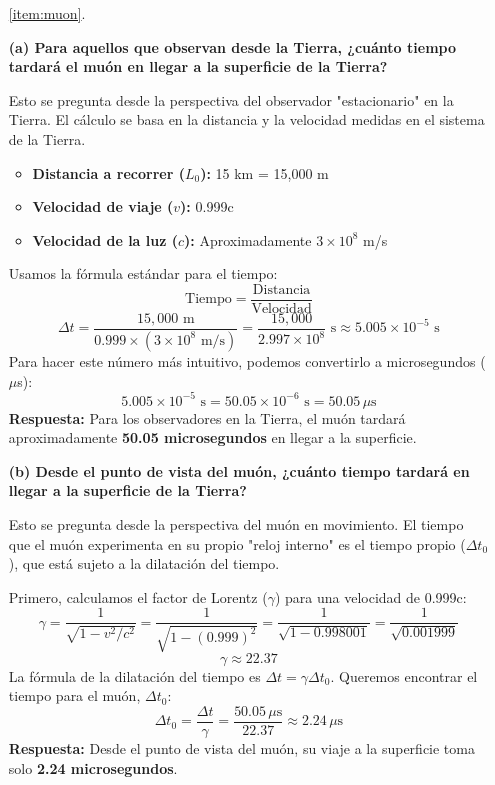 \documentclass[11pt,a4paper]{article}
\begin{document}
\begin{itemize}
    \item[\ref{item:muon}.]

\textbf{(a) Para aquellos que observan desde la Tierra, ¿cuánto tiempo tardará el muón en llegar a la superficie de la Tierra?}

Esto se pregunta desde la perspectiva del observador "estacionario" en la Tierra. El cálculo se basa en la distancia y la velocidad medidas en el sistema de la Tierra.

\begin{itemize}
    \item \textbf{Distancia a recorrer ($L_0$):} 15 km = 15,000 m
    \item \textbf{Velocidad de viaje ($v$):} 0.999c
    \item \textbf{Velocidad de la luz ($c$):} Aproximadamente $3 \times 10^8$ m/s
\end{itemize}
Usamos la fórmula estándar para el tiempo:
\[ \text{Tiempo} = \frac{\text{Distancia}}{\text{Velocidad}} \]
\[ \Delta t = \frac{15,000 \text{ m}}{0.999 \times (3 \times 10^8 \text{ m/s})} = \frac{15,000}{2.997 \times 10^8} \text{ s} \approx 5.005 \times 10^{-5} \text{ s} \]
Para hacer este número más intuitivo, podemos convertirlo a microsegundos ($\mu$s):
\[ 5.005 \times 10^{-5} \text{ s} = 50.05 \times 10^{-6} \text{ s} = 50.05 \, \mu\text{s} \]
\textbf{Respuesta:} Para los observadores en la Tierra, el muón tardará aproximadamente \textbf{50.05 microsegundos} en llegar a la superficie.

\textbf{(b) Desde el punto de vista del muón, ¿cuánto tiempo tardará en llegar a la superficie de la Tierra?}

Esto se pregunta desde la perspectiva del muón en movimiento. El tiempo que el muón experimenta en su propio "reloj interno" es el tiempo propio ($\Delta t_0$), que está sujeto a la dilatación del tiempo.

Primero, calculamos el factor de Lorentz ($\gamma$) para una velocidad de 0.999c:
\[ \gamma = \frac{1}{\sqrt{1 - v^2/c^2}} = \frac{1}{\sqrt{1 - (0.999)^2}} = \frac{1}{\sqrt{1 - 0.998001}} = \frac{1}{\sqrt{0.001999}} \]
\[ \gamma \approx 22.37 \]
La fórmula de la dilatación del tiempo es $\Delta t = \gamma \Delta t_0$. Queremos encontrar el tiempo para el muón, $\Delta t_0$:
\[ \Delta t_0 = \frac{\Delta t}{\gamma} = \frac{50.05 \, \mu\text{s}}{22.37} \approx 2.24 \, \mu\text{s} \]
\textbf{Respuesta:} Desde el punto de vista del muón, su viaje a la superficie toma solo \textbf{2.24 microsegundos}.


\end{itemize}
\end{document}

